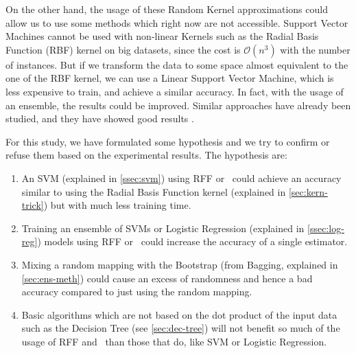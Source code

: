 \begin{pre-delivery}
  On the other hand, the usage of these Random Kernel approximations could
  allow us to use some methods which right now are not accessible. Support
  Vector Machines cannot be used with non-linear Kernels such as the Radial
  Basis Function (RBF) kernel on big datasets, since the cost is
  $\mathcal{O}(n^3)$
  with the number of instances.
  But if
  we transform the data to some space almost equivalent to the one of the
  RBF kernel, we can use a Linear Support Vector Machine, which is less
  expensive to train, and achieve a similar accuracy. In fact, with the usage
  of an ensemble, the results could be improved. Similar approaches have
  already been studied, and they have showed good results \cite{svm_rff}
  \cite{Zhang2017StackedKN} \cite{rahimi2008random}.

  For this study, we have formulated some hypothesis and we try to confirm or
  refuse them based on the experimental results. The hypothesis are:
  \begin{enumerate}
    \item An SVM (explained in \ref{ssec:svm}) using RFF or \Nys\ could achieve an accuracy similar to
    using the Radial Basis Function kernel (explained in \ref{sec:kern-trick})
    but with much less training time.
    \item Training an ensemble of SVMs or Logistic Regression (explained in
    \ref{ssec:log-reg}) models using
    RFF or \Nys\ could increase the accuracy of a single estimator.
    \item Mixing a random mapping with the Bootstrap (from Bagging, explained
    in \ref{sec:ens-meth}) could cause
    an excess of randomness and hence a bad accuracy compared to just using
    the random mapping.
    \item Basic algorithms which are not based on the dot product of the
    input data such as the Decision Tree (see \ref{sec:dec-tree}) will not benefit so much of the
    usage of RFF and \Nys\ than those that do, like SVM or
    Logistic Regression.
  \end{enumerate}


\end{pre-delivery}
